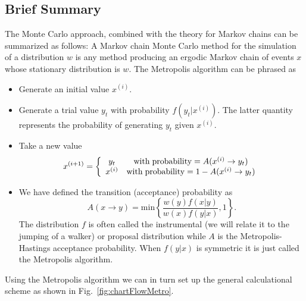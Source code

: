 \subsection{Brief Summary}
The Monte Carlo approach, combined with the theory for Markov chains can be summarized as follows:
A Markov chain Monte Carlo method for the simulation of a distribution $w$ is any method producing an 
ergodic Markov chain of events $x$ whose stationary distribution is $w$. The Metropolis algorithm can be phrased as
\begin{svgraybox}
\begin{itemize}
\item Generate an initial value $x^{(i)}$.
\item Generate a trial value $y_t$ with probability $f(y_t|x^{(i)})$. The latter quantity represents the probability of generating $y_t$ given $x^{(i)}$.
\item Take a new value 
\[ 
x^{(i+1)}= \left\{\begin{array}{cc} y_t & \mathrm{with\hspace{0.1cm}probability} = A(x^{(i)}\rightarrow y_t) \\
                                          x^{(i)}    & \mathrm{with \hspace{0.1cm}probability} = 1-A(x^{(i)}\rightarrow y_t)\end{array}\right .
\] 
\item We have defined the transition (acceptance) probability as 
\[
   A(x\rightarrow y)= \mathrm{min}\left\{\frac{w(y)f(x|y)}{w(x)f(y|x)},1\right\}.
\]
The distribution $f$ is often called the instrumental (we will relate it to the 
jumping of a walker) or proposal distribution while $A$ is the Metropolis-Hastings
acceptance probability.  When $f(y|x)$ is symmetric it is just called the Metropolis algorithm.
\end{itemize}
\end{svgraybox}
Using the Metropolis algorithm we can in turn set up the general calculational scheme as 
shown in Fig.~\ref{fig:chartFlowMetro}.
